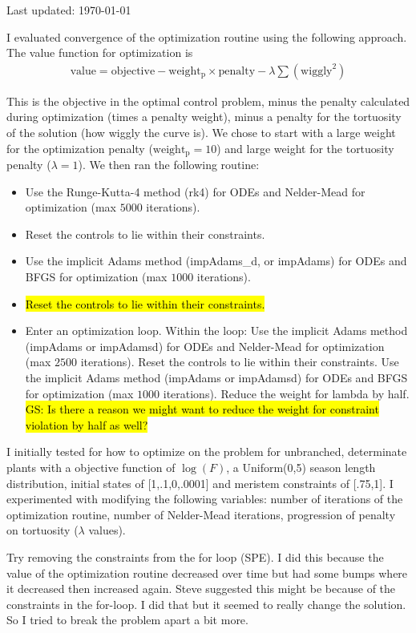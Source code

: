 \documentclass[12pt, oneside, titlepage]{article}   	%
\begin{document}
Last updated: \today

I evaluated convergence of the optimization routine using the following approach. The value function for optimization is 
%
\begin{align}
\mathrm{value} = \mathrm{objective} - \mathrm{weight_p} \times \mathrm{penalty} - \lambda \sum (\mathrm{wiggly}^2)
\end{align}

This is the objective in the optimal control problem, minus the penalty calculated during optimization (times a penalty weight), minus a penalty for the tortuosity of the solution (how wiggly the curve is). We chose to start with a large weight for the optimization penalty ($\mathrm{weight_p}=10$) and large weight for the tortuosity penalty ($\lambda=1$). We then ran the following routine: 

\begin{itemize}
\item Use the Runge-Kutta-4 method (rk4) for ODEs and Nelder-Mead for optimization (max $5000$ iterations).
\item Reset the controls to lie within their constraints.
\item Use the implicit Adams method (impAdams\_d, or impAdams) for ODEs and BFGS for optimization (max $1000$ iterations).
\item \hl{Reset the controls to lie within their constraints.}
\item Enter an optimization loop. Within the loop:
\subitem Use the implicit Adams method (impAdams or impAdamsd) for ODEs and Nelder-Mead for optimization (max $2500$ iterations).
\subitem Reset the controls to lie within their constraints.
\subitem Use the implicit Adams method (impAdams or impAdamsd) for ODEs and BFGS for optimization (max $1000$ iterations).
\subitem Reduce the weight for lambda by half.
\subitem \hl{GS: Is there a reason we might want to reduce the weight for constraint violation by half as well?}
\end{itemize}

I initially tested for how to optimize on the problem for unbranched, determinate plants with a objective function of $\log(F)$, a Uniform(0,5) season length distribution, initial states of [1,.1,0,.0001] and meristem constraints of [.75,1]. I experimented with modifying the following variables: number of iterations of the optimization routine, number of Nelder-Mead iterations, progression of penalty on tortuosity ($\lambda$ values).

Try removing the constraints from the for loop (SPE). I did this because the value of the optimization routine decreased over time but had some bumps where it decreased then increased again. Steve suggested this might be because of the constraints in the for-loop. I did that but it seemed to really change the solution. So I tried to break the problem apart a bit more. 
\end{document}
